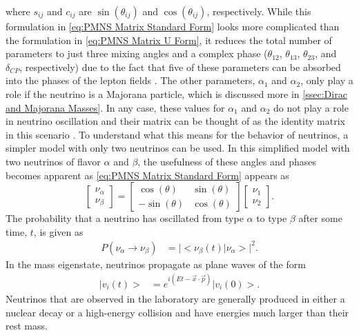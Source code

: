 where $s_{ij}$ and $c_{ij}$ are $\sin(\theta_{ij})$ and $\cos(\theta_{ij})$, respectively.
While this formulation in \autoref{eq:PMNS Matrix Standard Form} looks more complicated than the formulation in \autoref{eq:PMNS Matrix U Form}, it reduces the total number of parameters to just three mixing angles and a complex phase ($\theta_{12}$, $\theta_{13}$, $\theta_{23}$, and $\delta_{CP}$, respectively) due to the fact that five of these parameters can be absorbed into the phases of the lepton fields \cite{Valle:2006}.
The other parameters, $\alpha_1$ and $\alpha_2$, only play a role if the neutrino is a Majorana particle, which is discussed more in \autoref{ssec:Dirac and Majorana Masses}.
In any case, these values for $\alpha_1$ and $\alpha_2$ do not play a role in neutrino oscillation and their matrix can be thought of as the identity matrix in this scenario \cite{BILENKY1980495}.
To understand what this means for the behavior of neutrinos, a simpler model with only two neutrinos can be used.
In this simplified model with two neutrinos of flavor $\alpha$ and $\beta$, the usefulness of these angles and phases becomes apparent as \autoref{eq:PMNS Matrix Standard Form} appears as
\begin{equation}
\begin{bmatrix}
\nu_\alpha \\
\nu_\beta 
\end{bmatrix}
=
\begin{bmatrix}
\cos(\theta) & \sin(\theta) \\
-\sin(\theta) & \cos(\theta) 
\end{bmatrix}
\begin{bmatrix}
\nu_1 \\
\nu_2 
\end{bmatrix}.
\end{equation}
The probability that a neutrino has oscillated from type $\alpha$ to type $\beta$ after some time, $t$, is given as 
\begin{align}
P(\nu_\alpha\rightarrow\nu_\beta) &= \lvert<\nu_\beta(t)| \nu_\alpha>\rvert^2.
\end{align}
In the mass eigenstate, neutrinos propagate as plane waves of the form
\begin{align}
|v_i(t)>&=e^{i(Et-\vec{x}\cdot\vec{p})}|v_i(0)>.
\label{eq:OscillationProbability_general}
\end{align}
Neutrinos that are observed in the laboratory are generally produced in either a nuclear decay or a high-energy collision and have energies much larger than their rest mass.
